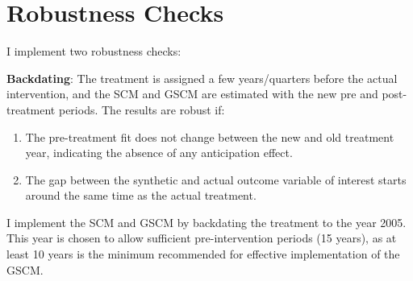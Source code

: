 \documentclass[12pt,nobind, a4paper]{reedthesis}
\begin{document}
 \hypertarget{rob}{%
 \section{Robustness Checks}\label{rob}}

 I implement two robustness checks:

 \textbf{Backdating}: The treatment is assigned a few years/quarters before the actual intervention, and the SCM and GSCM are estimated with the new pre and post-treatment periods. The results are robust if:
 \begin{enumerate}
 \def\labelenumi{\alph{enumi}.}
 \item
   The pre-treatment fit does not change between the new and old treatment year, indicating the absence of any anticipation effect.
 \item
   The gap between the synthetic and actual outcome variable of interest starts around the same time as the actual treatment.
   \linebreak
 \end{enumerate}
 I implement the SCM and GSCM by backdating the treatment to the year 2005. This year is chosen to allow sufficient pre-intervention periods (15 years), as at least 10 years is the minimum recommended for effective implementation of the GSCM.
\end{document}
